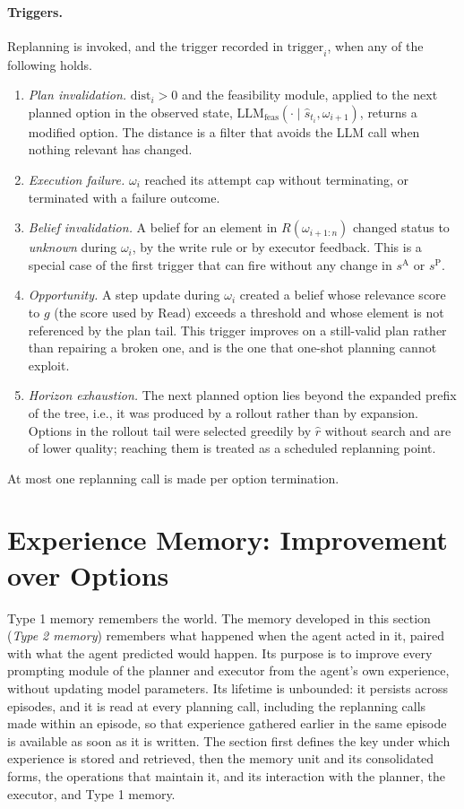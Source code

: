 \documentclass[11pt]{article}
\newcommand{\llm}[1]{\mathrm{LLM}_{\mathrm{#1}}}
\newcommand{\Rel}{R}
\newcommand{\shat}{\hat{s}}
\newcommand{\sA}{s^{\mathrm{A}}}
\newcommand{\sP}{s^{\mathrm{P}}}
\newcommand{\Read}{\mathrm{Read}}
\newcommand{\dist}{\mathrm{dist}}
\begin{document}
\paragraph{Triggers.}
Replanning is invoked, and the trigger recorded in $\mathrm{trigger}_i$, when any of the following holds.
\begin{enumerate}[leftmargin=1.5em,itemsep=1pt]
\item \emph{Plan invalidation.} $\dist_i>0$ and the feasibility module, applied to the next planned option in the observed state, $\llm{feas}(\cdot\mid\shat_{t_i},\omega_{i+1})$, returns a modified option. The distance is a filter that avoids the LLM call when nothing relevant has changed.
\item \emph{Execution failure.} $\omega_i$ reached its attempt cap without terminating, or terminated with a failure outcome.
\item \emph{Belief invalidation.} A belief for an element in $\Rel(\omega_{i+1:n})$ changed status to \emph{unknown} during $\omega_i$, by the write rule or by executor feedback. This is a special case of the first trigger that can fire without any change in $\sA$ or $\sP$.
\item \emph{Opportunity.} A step update during $\omega_i$ created a belief whose relevance score to $g$ (the score used by $\Read$) exceeds a threshold and whose element is not referenced by the plan tail. This trigger improves on a still-valid plan rather than repairing a broken one, and is the one that one-shot planning cannot exploit.
\item \emph{Horizon exhaustion.} The next planned option lies beyond the expanded prefix of the tree, i.e., it was produced by a rollout rather than by expansion. Options in the rollout tail were selected greedily by $\hat r$ without search and are of lower quality; reaching them is treated as a scheduled replanning point.
\end{enumerate}
At most one replanning call is made per option termination.

\section{Experience Memory: Improvement over Options}
\label{sec:type2}

Type 1 memory remembers the world. The memory developed in this section (\emph{Type 2 memory}) remembers what happened when the agent acted in it, paired with what the agent predicted would happen. Its purpose is to improve every prompting module of the planner and executor from the agent's own experience, without updating model parameters. Its lifetime is unbounded: it persists across episodes, and it is read at every planning call, including the replanning calls made within an episode, so that experience gathered earlier in the same episode is available as soon as it is written. The section first defines the key under which experience is stored and retrieved, then the memory unit and its consolidated forms, the operations that maintain it, and its interaction with the planner, the executor, and Type 1 memory.
\end{document}
